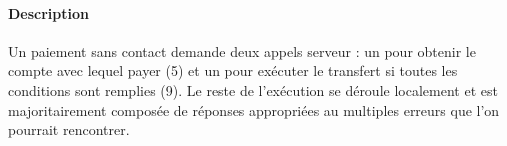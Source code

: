 \paragraph{Description} Un paiement sans contact demande deux appels serveur : un pour obtenir le compte avec lequel payer (5) et un pour exécuter le transfert si toutes les conditions sont remplies (9). Le reste de l'exécution se déroule localement et est majoritairement composée de réponses appropriées au multiples erreurs que l'on pourrait rencontrer.